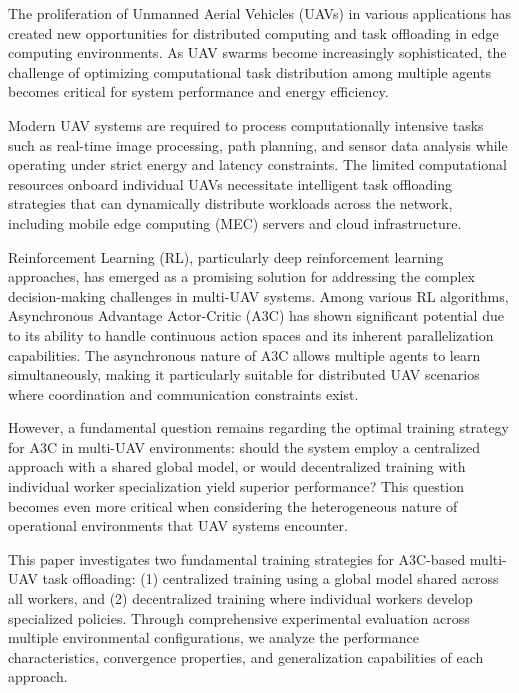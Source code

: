 
The proliferation of Unmanned Aerial Vehicles (UAVs) in various applications has created new opportunities for distributed computing and task offloading in edge computing environments. As UAV swarms become increasingly sophisticated, the challenge of optimizing computational task distribution among multiple agents becomes critical for system performance and energy efficiency.

Modern UAV systems are required to process computationally intensive tasks such as real-time image processing, path planning, and sensor data analysis while operating under strict energy and latency constraints. The limited computational resources onboard individual UAVs necessitate intelligent task offloading strategies that can dynamically distribute workloads across the network, including mobile edge computing (MEC) servers and cloud infrastructure.

Reinforcement Learning (RL), particularly deep reinforcement learning approaches, has emerged as a promising solution for addressing the complex decision-making challenges in multi-UAV systems. Among various RL algorithms, Asynchronous Advantage Actor-Critic (A3C) has shown significant potential due to its ability to handle continuous action spaces and its inherent parallelization capabilities. The asynchronous nature of A3C allows multiple agents to learn simultaneously, making it particularly suitable for distributed UAV scenarios where coordination and communication constraints exist.

However, a fundamental question remains regarding the optimal training strategy for A3C in multi-UAV environments: should the system employ a centralized approach with a shared global model, or would decentralized training with individual worker specialization yield superior performance? This question becomes even more critical when considering the heterogeneous nature of operational environments that UAV systems encounter.

This paper investigates two fundamental training strategies for A3C-based multi-UAV task offloading: (1) centralized training using a global model shared across all workers, and (2) decentralized training where individual workers develop specialized policies. Through comprehensive experimental evaluation across multiple environmental configurations, we analyze the performance characteristics, convergence properties, and generalization capabilities of each approach.